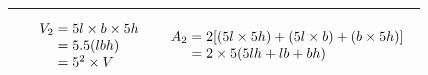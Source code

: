 \begin{minipage}[h]{1.2\textwidth}
\begin{table}[H]
\begin{tabular}{|m{5cm}|c|c|}
\begin{center}
\end{center}
& 
\begin{equation*}
  \begin{array}{r@{\;}l}
    V_2
    &= 5l \times b \times 5h \\
    &= 5.5(lbh) \\
    &= 5^2 \times V
  \end{array}
\end{equation*}
&
\begin{equation*}
  \begin{array}{r@{\;}l}
    A_2
    &= 2[(5l\times 5h) + (5l \times b)+ (b \times 5h)] \\
    &= 2\times 5(5lh + lb + bh)
  \end{array}
\end{equation*}
\\ \hline


\end{tabular}
\end{table}
\end{minipage}
